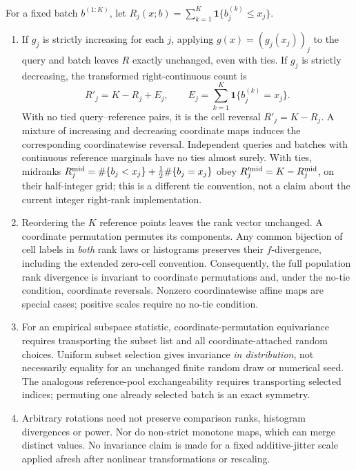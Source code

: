 {\begin{proposition}\label{prop:rank-symmetries}
For a fixed batch $b^{(1:K)}$, let $R_j(x;b)=\sum_{k=1}^K\mathbf1\{b_j^{(k)}\le x_j\}$.
\begin{enumerate}[label=\textup{(\roman*)},leftmargin=*]
\item If $g_j$ is strictly increasing for each $j$, applying $g(x)=(g_j(x_j))_j$ to the query and batch leaves $R$ exactly unchanged, even with ties. If $g_j$ is strictly decreasing, the transformed right-continuous count is
\[
R'_j=K-R_j+E_j,\qquad E_j=\sum_{k=1}^K\mathbf1\{b_j^{(k)}=x_j\}.
\]
With no tied query--reference pairs, it is the cell reversal $R'_j=K-R_j$. A mixture of increasing and decreasing coordinate maps induces the corresponding coordinatewise reversal. Independent queries and batches with continuous reference marginals have no ties almost surely. With ties, midranks $R^{\rm mid}_j=\#\{b_j<x_j\}+\tfrac12\#\{b_j=x_j\}$ obey $R'^{\rm mid}_j=K-R^{\rm mid}_j$, on their half-integer grid; this is a different tie convention, not a claim about the current integer right-rank implementation.
\item Reordering the $K$ reference points leaves the rank vector unchanged. A coordinate permutation permutes its components. Any common bijection of cell labels in \emph{both} rank laws or histograms preserves their $f$-divergence, including the extended zero-cell convention. Consequently, the full population rank divergence is invariant to coordinate permutations and, under the no-tie condition, coordinate reversals. Nonzero coordinatewise affine maps are special cases; positive scales require no no-tie condition.
\item For an empirical subspace statistic, coordinate-permutation equivariance requires transporting the subset list and all coordinate-attached random choices. Uniform subset selection gives invariance \emph{in distribution}, not necessarily equality for an unchanged finite random draw or numerical seed. The analogous reference-pool exchangeability requires transporting selected indices; permuting one already selected batch is an exact symmetry.
\item Arbitrary rotations need not preserve comparison ranks, histogram divergences or power. Nor do non-strict monotone maps, which can merge distinct values. No invariance claim is made for a fixed additive-jitter scale applied afresh after nonlinear transformations or rescaling.
\end{enumerate}

\end{proposition}}
